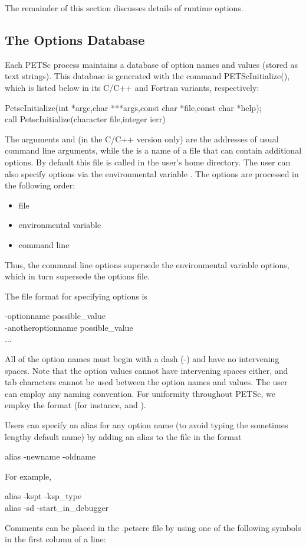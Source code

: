 {{The remainder of this section discusses details of runtime options.

\subsection{The Options Database}

Each PETSc process maintains a database of option names and values
(stored as text strings). This database is generated with the command
PETScInitialize(), which is listed below in its C/C++ and
Fortran variants, respectively:
\begin{tabbing}
  PetscInitialize(int *argc,char ***args,const char *file,const char *help);\\
   call PetscInitialize(character file,integer ierr)
\end{tabbing}
The arguments  and  (in the C/C++ version only) are
the addresses of usual command line arguments, while the  is a name of
a file that can contain additional options.
By default this file is called   in the
user's home directory.  The user can also specify options via the
environmental variable .  
The options are processed in the following order:
\begin{itemize}
\item file
\item environmental variable
\item command line
\end{itemize}
Thus, the command line options supersede the environmental variable
options, which in turn supersede the options file.

The file format for specifying options is
\begin{tabbing}
   -optionname possible\_value\\
   -anotheroptionname possible\_value\\
   ...
\end{tabbing}
All of the option names must begin with a dash (-) and have no intervening
spaces.  Note that the option values cannot
have intervening spaces either, and tab characters cannot be used
between the option names and values.
The user can employ any naming convention.  For uniformity throughout
PETSc, we employ the format  (for instance,
 and ).

Users can specify an alias for any option name (to avoid typing the
sometimes lengthy default name) by adding an alias to the
  file in the format
 
\begin{tabbing}
   alias -newname -oldname
\end{tabbing}
For example,
\begin{tabbing}
   alias -kspt -ksp\_type\\
   alias -sd -start\_in\_debugger
\end{tabbing}
Comments can be placed in the .petscrc file by using one of the
following symbols in the first column of a line: \trl{#, %

}}}

